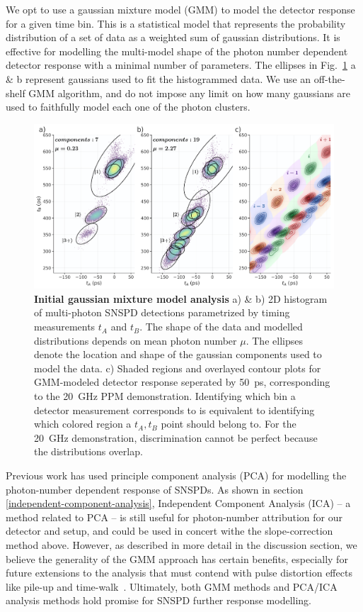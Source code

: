 \documentclass[11pt]{caltech_thesis} %
\begin{document}
We opt to use a gaussian mixture model (GMM) to model the detector response for a given time bin. This is a statistical model that represents the probability distribution of a set of data as a weighted sum of gaussian distributions. It is effective for modelling the multi-model shape of the photon number dependent detector response with a minimal number of parameters. The ellipses in Fig.~\ref{fig:gmm_model} a \& b represent gaussians used to fit the histogrammed data. We use an off-the-shelf GMM algorithm, and do not impose any limit on how many gaussians are used to faithfully model each one of the photon clusters.

\hypertarget{fig:gmm_model}{%
\begin{figure}
\centering
\includegraphics[width=1\textwidth,height=\textheight]{./chapter_04/figs/gmm_intro_analysis_t_light.pdf}
\caption[{Initial gaussian mixture model analysis}]{\textbf{Initial gaussian mixture model analysis} a) \& b) 2D histogram of multi-photon SNSPD detections parametrized by timing measurements $t_A$ and $t_B$. The shape of the data and modelled distributions depends on mean photon number $\mu$. The ellipses denote the location and shape of the gaussian components used to model the data. c) Shaded regions and overlayed contour plots for GMM-modeled detector response seperated by 50~ps, corresponding to the 20~GHz PPM demonstration. Identifying which bin a detector measurement corresponds to is equivalent to identifying which colored region a $t_A, t_B$ point should belong to. For the 20~GHz demonstration, discrimination cannot be perfect because the distributions overlap.}
\label{fig:gmm_model}
\end{figure}
}

Previous work has used principle component analysis (PCA) for modelling the photon-number dependent response of SNSPDs. As shown in section \ref{independent-component-analysis}, Independent Component Analysis (ICA) -- a method related to PCA -- is still useful for photon-number attribution for our detector and setup, and could be used in concert withe the slope-correction method above. However, as described in more detail in the discussion section, we believe the generality of the GMM approach has certain benefits, especially for future extensions to the analysis that must contend with pulse distortion effects like pile-up and time-walk~\autocite{Mueller2023}. Ultimately, both GMM methods and PCA/ICA analysis methods hold promise for SNSPD further response modelling.
\end{document}
